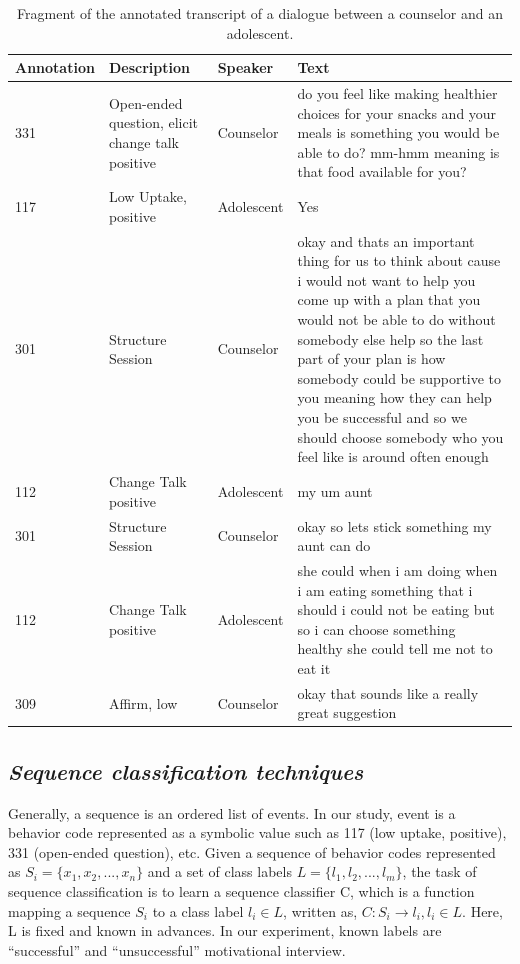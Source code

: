 \documentclass{amia}
\begin{document}
\begin{table}[h]
\caption{Fragment of the annotated transcript of a dialogue between a counselor and an adolescent.}    
\label{tab:anno_examp}
\centering
\begin{tabular}{|l|p{3.6cm}|l|p{8cm}|}
\hline
Annotation  & Description & Speaker & Text \\\hline
331 &	Open-ended question, elicit change talk positive &	Counselor &	do you feel like making healthier choices for your snacks and your meals is something you would be able to do? mm-hmm meaning is that food available for you? \\\hline
117 &	Low Uptake, positive	& Adolescent &	Yes \\\hline
301 &	Structure Session	& Counselor &	okay and thats an important thing for us to think about cause i would not want to help you come up with a plan that you would not be able to do without somebody else help so the last part of your plan is how somebody could be supportive to you meaning how they can help you be successful and so we should choose somebody who you feel like is around often enough \\\hline
112 &	Change Talk positive	& Adolescent &	my um aunt \\\hline
301 &	Structure Session	& Counselor &	okay so lets stick something my aunt can do \\\hline
112 &	Change Talk positive &	Adolescent &	she could when i am doing when i am eating something that i should i could not be eating but so i can choose something healthy she could tell me not to eat it \\\hline
309 &	Affirm, low &	Counselor &	okay that sounds like a really great suggestion \\\hline
\end{tabular}
\end{table}  

\subsection*{\textit{Sequence classification techniques}}
Generally, a sequence is an ordered list of events. In our study, event is a behavior code represented as a symbolic value such as 117 (low uptake, positive), 331 (open-ended question), etc.  Given a sequence of behavior codes represented as $S_i = \{x_1, x_2,...,x_n\}$ and a set of class labels $L = \{l_1, l_2,...,l_m\}$, the task of sequence classification is to learn a sequence classifier C, which is a function mapping a sequence $S_i$ to a class label $l_i \in L$, written as, $C : S_i \to l_i, l_i \in L$. Here, L is fixed and known in advances. In our experiment, known labels are ``successful'' and ``unsuccessful'' motivational interview. 
\end{document}

